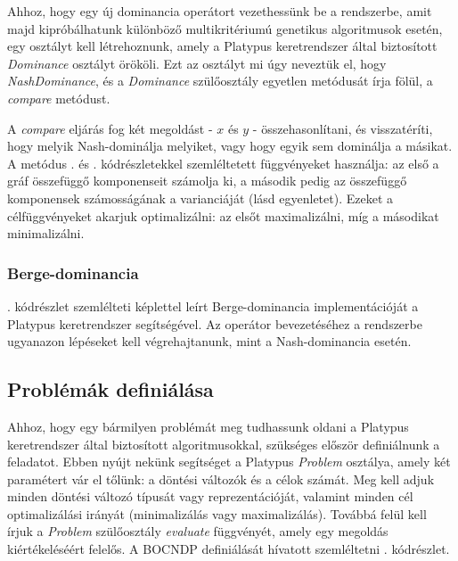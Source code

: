 

Ahhoz, hogy egy új dominancia operátort vezethessünk be a rendszerbe, amit majd kipróbálhatunk különböző multikritériumú genetikus algoritmusok esetén,
egy osztályt kell létrehoznunk, amely a Platypus keretrendszer által biztosított \emph{Dominance} osztályt örököli.
Ezt az osztályt mi úgy neveztük el, hogy \emph{NashDominance}, és a \emph{Dominance} szülőosztály egyetlen metódusát írja fölül, a \emph{compare} metódust.

A \emph{compare} eljárás fog két megoldást - $x$ és $y$ - összehasonlítani, és visszatéríti, hogy melyik Nash-dominálja melyiket, vagy hogy egyik sem dominálja a másikat.
A metódus . és . kódrészletekkel szemléltetett függvényeket használja:
az első a gráf összefüggő komponenseit számolja ki, a második pedig az összefüggő komponensek számosságának a varianciáját (lásd  egyenletet).
Ezeket a célfüggvényeket akarjuk optimalizálni: az elsőt maximalizálni, míg a másodikat minimalizálni.


\subsubsection{Berge-dominancia}
. kódrészlet szemlélteti  képlettel leírt Berge-dominancia implementációját a Platypus keretrendszer segítségével.
Az operátor bevezetéséhez a rendszerbe ugyanazon lépéseket kell végrehajtanunk, mint a Nash-dominancia esetén.




\subsection{Problémák definiálása}
Ahhoz, hogy egy bármilyen problémát meg tudhassunk oldani a Platypus keretrendszer által biztosított algoritmusokkal, szükséges először definiálnunk a feladatot.
Ebben nyújt nekünk segítséget a Platypus \emph{Problem} osztálya, amely két paramétert vár el tőlünk: a döntési változók és a célok számát.
Meg kell adjuk minden döntési változó típusát vagy reprezentációját, valamint minden cél optimalizálási irányát (minimalizálás vagy maximalizálás).
Továbbá felül kell írjuk a \emph{Problem} szülőosztály \emph{evaluate} függvényét, amely egy megoldás kiértékeléséért felelős.
A BOCNDP definiálását hívatott szemléltetni . kódrészlet.

